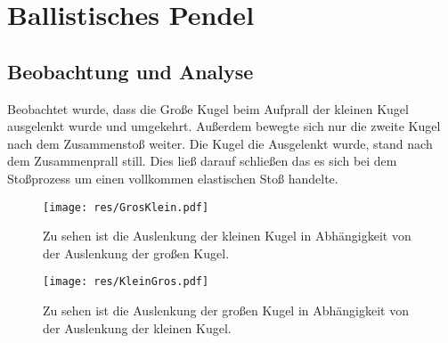 \section{Ballistisches Pendel}\label{kap:Bal}
\subsection*{Beobachtung und Analyse}
Beobachtet wurde, dass die Große Kugel beim Aufprall der kleinen Kugel ausgelenkt wurde und umgekehrt. Außerdem bewegte sich nur die zweite Kugel nach dem Zusammenstoß weiter. Die Kugel die Ausgelenkt wurde, stand nach dem Zusammenprall still. Dies ließ darauf schließen das es sich bei dem Stoßprozess um einen vollkommen elastischen Stoß handelte.

\begin{figure}[h]
	\centering
	\texttt{[image: res/GrosKlein.pdf]}
	\caption{Zu sehen ist die Auslenkung der kleinen Kugel in Abhängigkeit von der Auslenkung der großen Kugel.}
	\label{fig:grosklein}
\end{figure}
\begin{figure}[h]
	\centering
	\texttt{[image: res/KleinGros.pdf]}
	\caption{Zu sehen ist die Auslenkung der großen Kugel in Abhängigkeit von der Auslenkung der kleinen Kugel.}
	\label{fig:kleingros}
\end{figure}

